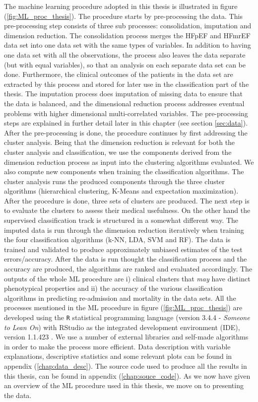 \documentclass[../thesis.tex]{subfiles}
\begin{document}
\indent The machine learning procedure adopted in this thesis is illustrated in figure (\ref{fig:ML_proc_thesis}). The procedure starts by pre-processing the data. This pre-processing step consists of three sub processes: consolidation, imputation and dimension reduction. The consolidation process merges the HFpEF and HFmrEF data set into one data set with the same types of variables. In addition to having one data set with all the observations, the process also leaves the data separate (but with equal variables), so that an analysis on each separate data set can be done. Furthermore, the clinical outcomes of the patients in the data set are extracted by this process and stored for later use in the classification part of the thesis. The imputation process does imputation of missing data to ensure that the data is balanced, and the dimensional reduction process addresses eventual problems with higher dimensional multi-correlated variables. The pre-processing steps are explained in further detail later in this chapter (see section \ref{sec:data}). After the pre-processing is done, the procedure continues by first addressing the cluster analysis. Being that the dimension reduction is relevant for both the cluster analysis and classification, we use the components derived from the dimension reduction process as input into the clustering algorithms evaluated. We also compute new components when training the classification algorithms. The cluster analysis runs the produced components through the three cluster algorithms (hierarchical clustering, K-Means and expectation maximization). After the procedure is done, three sets of clusters are produced. The next step is to evaluate the clusters to assess their medical usefulness. On the other hand the supervised classification track is structured in a somewhat different way. The imputed data is run through the dimension reduction iteratively when training the four classification algorithms (k-NN, LDA, SVM and RF). The data is trained and validated to produce approximately unbiased estimates of the test errors/accuracy. After the data is run thought the classification process and the accuracy are produced, the algorithms are ranked and evaluated accordingly. The outputs of the whole ML procedure are i) clinical clusters that \textit{may} have distinct phenotypical properties and ii) the accuracy of the various classification algorithms in predicting re-admission and mortality in the data sets. All the processes mentioned in the ML procedure in figure (\ref{fig:ML_proc_thesis}) are developed using the \texttt{R} statistical programming language (version 3.4.4 - \textit{Someone to Lean On}) \citep{Rsoftware2018} with RStudio as the integrated development environment (IDE), version 1.1.423 \citep{RStudio2018}. We use a number of external libraries and self-made algorithms in order to make the process more efficient. Data description with variable explanations, descriptive statistics and some relevant plots can be found in appendix (\ref{chap:data_desc}). The source code used to produce all the results in this thesis, can be found in appendix (\ref{chap:souce_code}). As we now have given an overview of the ML procedure used in this thesis, we move on to presenting the data.
\end{document}
